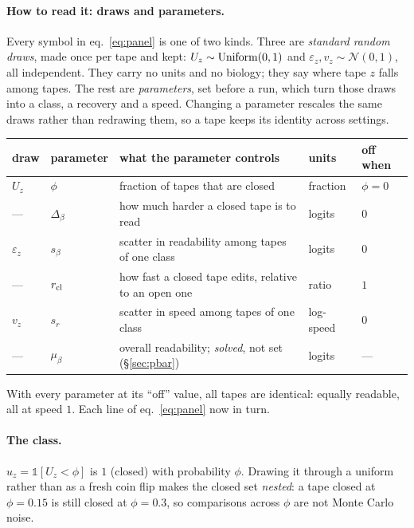\paragraph{How to read it: draws and parameters.} Every symbol in eq.~\eqref{eq:panel} is one of two
kinds. Three are \emph{standard random draws}, made once per tape and kept: $U_z\sim\operatorname{Uniform}(0,1)$ and
$\varepsilon_z,v_z\sim\mathcal N(0,1)$, all independent. They carry no units and no biology; they say
where tape $z$ falls among tapes. The rest are \emph{parameters}, set before a run, which turn those
draws into a class, a recovery and a speed. Changing a parameter rescales the same draws rather than
redrawing them, so a tape keeps its identity across settings.
\begin{center}\small
\begin{tabular}{@{}llp{}ll@{}}
\toprule
draw & parameter & what the parameter controls & units & off when \\
\midrule
$U_z$           & $\phi$          & fraction of tapes that are closed               & fraction      & $\phi=0$ \\
---             & $\Delta_\beta$  & how much harder a closed tape is to read        & logits        & $0$ \\
$\varepsilon_z$ & $s_\beta$       & scatter in readability among tapes of one class & logits        & $0$ \\
---             & $r_{\rm cl}$    & how fast a closed tape edits, relative to an open one & ratio   & $1$ \\
$v_z$           & $s_r$           & scatter in speed among tapes of one class       & log-speed     & $0$ \\
---             & $\mu_\beta$     & overall readability; \emph{solved}, not set (\S\ref{sec:pbar}) & logits & --- \\
\bottomrule
\end{tabular}
\end{center}
With every parameter at its ``off'' value, all tapes are identical: equally readable, all at speed
$1$. Each line of eq.~\eqref{eq:panel} now in turn.

\paragraph{The class.} $u_z=\mathbb 1[U_z<\phi]$ is $1$ (closed) with probability $\phi$. Drawing it
through a uniform rather than as a fresh coin flip makes the closed set \emph{nested}: a tape closed at
$\phi=0.15$ is still closed at $\phi=0.3$, so comparisons across $\phi$ are not Monte Carlo noise.

